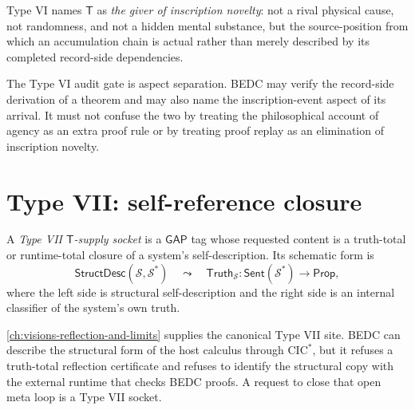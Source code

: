 \begin{definition}
\label{def:transcendental-supply-type-VI-reading}
Type VI names $\mathsf{T}$ as \emph{the giver of inscription novelty}: not a rival physical cause, not randomness, and not a hidden mental substance, but the source-position from which an accumulation chain is actual rather than merely described by its completed record-side dependencies.
\end{definition}

\begin{remark}
\label{rem:transcendental-supply-type-VI-gate}
The Type VI audit gate is aspect separation. BEDC may verify the record-side derivation of a theorem and may also name the inscription-event aspect of its arrival. It must not confuse the two by treating the philosophical account of agency as an extra proof rule or by treating proof replay as an elimination of inscription novelty.
\end{remark}

\section{Type VII: self-reference closure}
\label{sec:transcendental-supply-type-VII}

\begin{definition}
\label{def:transcendental-supply-type-VII}
A \emph{Type VII $\mathsf{T}$-supply socket} is a $\mathsf{GAP}$ tag whose requested content is a truth-total or runtime-total closure of a system's self-description. Its schematic form is
$$
\mathsf{StructDesc}(\mathcal{S},\mathcal{S}^{*})
\quad\leadsto\quad
\mathsf{Truth}_{\mathcal{S}}:\mathsf{Sent}(\mathcal{S}^{*})\to\mathsf{Prop},
$$
where the left side is structural self-description and the right side is an internal classifier of the system's own truth.
\end{definition}

\begin{example}
\label{ex:transcendental-supply-type-VII-engineering}
\autoref{ch:visions-reflection-and-limits} supplies the canonical Type VII site. BEDC can describe the structural form of the host calculus through $\mathrm{CIC}^{*}$, but it refuses a truth-total reflection certificate and refuses to identify the structural copy with the external runtime that checks BEDC proofs. A request to close that open meta loop is a Type VII socket.
\end{example}

